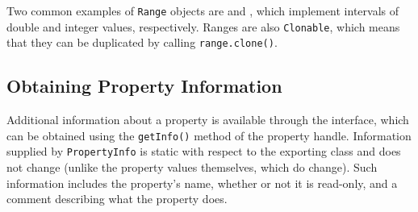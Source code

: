 \documentclass{article}
\begin{document}
Two common examples of {\tt Range} objects are 
 and
, 
which implement intervals of double and integer
values, respectively.  Ranges are also {\tt Clonable}, which means that
they can be duplicated by calling {\tt range.clone()}.

\label{propertyInfoSec}
\subsection{Obtaining Property Information}

Additional information about a property is available through the
interface, which can be obtained using the
{\tt getInfo()} method of the property handle.  Information supplied by
{\tt PropertyInfo} is static with respect to the exporting class and
does not change (unlike the property values themselves, which do
change). Such information includes the property's name, whether or not
it is read-only, and a comment describing what the property does.
\end{document}

